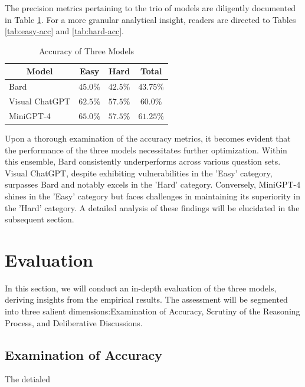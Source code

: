 \documentclass[journal,10pt]{IEEEtran}
\begin{document}
The precision metrics pertaining to the trio of models are diligently documented in Table \ref{tab:accuracy}. For a more granular analytical insight, readers are directed to Tables \ref{tab:easy-acc} and \ref{tab:hard-acc}.
\begin{table}[h]
    \centering
    \caption{Accuracy of Three Models}
    \label{tab:accuracy}
    \begin{tabular}{@{}lccc@{}}
    \toprule
    \multicolumn{1}{c}{Model} & Easy      & Hard & Total \\ \midrule
    Bard                      &  $45.0\%$ & $42.5\%$ &  $43.75\%$ \\
    Visual ChatGPT            &  $62.5\%$ & $57.5\%$ &  $60.0\%$  \\
    MiniGPT-4                 &  $65.0\%$ & $57.5\%$ &  $61.25\%$  \\ \bottomrule
    \end{tabular}
\end{table}

Upon a thorough examination of the accuracy metrics, it becomes evident that the performance of the three models necessitates further optimization. Within this ensemble, Bard consistently underperforms across various question sets. Visual ChatGPT, despite exhibiting vulnerabilities in the 'Easy' category, surpasses Bard and notably excels in the 'Hard' category. Conversely, MiniGPT-4 shines in the 'Easy' category but faces challenges in maintaining its superiority in the 'Hard' category. A detailed analysis of these findings will be elucidated in the subsequent section.

\section{Evaluation}
In this section, we will conduct an in-depth evaluation of the three models, deriving insights from the empirical results. The assessment will be segmented into three salient dimensions:Examination of Accuracy, Scrutiny of the Reasoning Process, and Deliberative Discussions.
\subsection{Examination of Accuracy}
The detialed 
\end{document}
